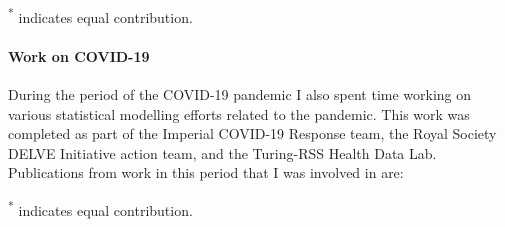\textsuperscript{*} indicates equal contribution.


\paragraph{Work on COVID-19}
During the period of the COVID-19 pandemic I also spent time working on various statistical modelling efforts related to the pandemic.
This work was completed as part of the Imperial COVID-19 Response team, the Royal Society DELVE Initiative action team, and the Turing-RSS Health Data Lab. Publications from work in this period that I was involved in are:
\nocite{mellan2020subnational,monod2020age,vollmer2020report,unwin2020state,he2020technical_hl,tehefficient_hl}

\textsuperscript{*} indicates equal contribution.
